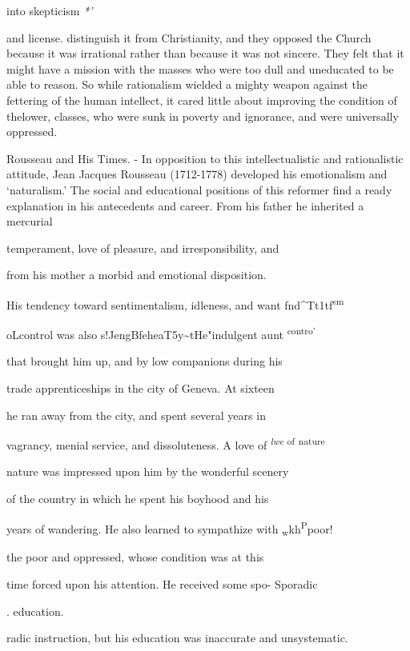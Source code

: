 \documentclass[]{book}
\begin{document}
into skepticism \emph{*'}

and license. distinguish it from Christianity, and they opposed the Church because it was irrational rather than because it was not sincere. They felt that it might have a mission with the masses who were too dull and uneducated to be able to reason. So while rationalism wielded a mighty weapon against the fettering of the human intellect, it cared little about improving the condition of thelower, classes, who were sunk in poverty and ignorance, and were universally oppressed.

Rousseau and His Times. - In opposition to this intellectualistic and rationalistic attitude, Jean Jacques Rousseau (1712-1778) developed his emotionalism and `naturalism.' The social and educational positions of this reformer find a ready explanation in his antecedents\protect\hypertarget{ch18.xmlux5cux23para.264.1.0.box.129.242.1047.36.q.60}{}{ and career. From his father he inherited a mercurial}

temperament, love of pleasure, and irresponsibility, and

from his mother a morbid and emotional disposition.

His tendency toward sentimentalism, idleness, and want fnd\^{}Tt1tf\textsuperscript{sm}

oLcontrol was also s!JengBfeheaT5y\textasciitilde{}tHe"indulgent aunt \textsuperscript{contro'}

that brought him up, and by low companions during his

trade apprenticeships in the city of Geneva. At sixteen

he ran away from the city, and spent several years in

vagrancy, menial service, and dissoluteness. A love of \emph{\textsuperscript{lwe}} \textsuperscript{of} \textsuperscript{nature}

nature was impressed upon him by the wonderful scenery

of the country in which he spent his boyhood and his

years of wandering. He also learned to sympathize with \textsubscript{w}kh\textsuperscript{P}poor!

the poor and oppressed, whose condition was at this

time forced upon his attention. He received some spo- Sporadic

. education.

radic instruction, but his education was inaccurate and unsystematic.
\end{document}
